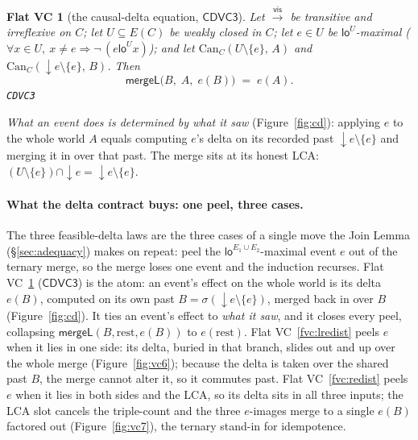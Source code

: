 \documentclass[11pt]{article}
\newtheorem{fvc}{Flat VC}
\newcommand{\vis}{\xrightarrow{\mathsf{vis}}}
\newcommand{\mergeL}{\mathsf{mergeL}}
\newcommand{\loE}[1]{\mathsf{lo}^{#1}}
\newcommand{\dow}[1]{{\downarrow}#1}
\newcommand{\cd}{\mathsf{CDVC3}}
\newcommand{\lean}[1]{\texttt{#1}}
\begin{document}
\begin{fvc}[the causal-delta equation, $\cd$]
\label{fvc:cd}
Let $\vis$ be transitive and irreflexive on $C$; let
$U \subseteq E(C)$ be weakly closed in $C$; let $e \in U$ be
$\loE{U}$-maximal
($\forall x \in U,\ x \neq e \Rightarrow \neg\,(e \mathrel{\loE{U}} x)$);
and let $\mathrm{Can}_C(U \setminus \{e\},\, A)$ and
$\mathrm{Can}_C(\dow{e} \setminus \{e\},\, B)$. Then
\[
  \mergeL\bigl(B,\; A,\; e(B)\bigr) \;=\; e(A).
\]
\hfill\lean{CDVC3}
\end{fvc}

\emph{What an event does is determined by what it saw}
(Figure~\ref{fig:cd}): applying $e$ to the whole world $A$ equals
computing $e$'s delta on its recorded past $\dow{e} \setminus \{e\}$
and merging it in over that past. The merge sits at its honest LCA:
$(U \setminus \{e\}) \cap \dow{e} = \dow{e} \setminus \{e\}$.

\paragraph{What the delta contract buys: one peel, three cases.} The three
feasible-delta laws are the three cases of a single move the Join Lemma
(\S\ref{sec:adequacy}) makes on repeat: peel the $\loE{E_1 \cup E_2}$-maximal
event $e$ out of the ternary merge, so the merge loses one event and the
induction recurses. Flat VC~\ref{fvc:cd} ($\cd$) is the atom: an event's
effect on the whole world is its delta $e(B)$, computed on its own past
$B = \sigma(\dow{e} \setminus \{e\})$, merged back in over $B$
(Figure~\ref{fig:cd}). It ties an event's effect to \emph{what it saw}, and
it closes every peel, collapsing $\mergeL(B, \text{rest}, e(B))$ to
$e(\text{rest})$. Flat VC~\ref{fvc:lredist} peels $e$ when it lies in one
side: its delta, buried in that branch, slides out and up over the whole
merge (Figure~\ref{fig:vc6}); because the delta is taken over the
shared past $B$, the merge cannot alter it, so it commutes past. Flat
VC~\ref{fvc:redist} peels $e$ when it lies in both sides and the LCA, so its
delta sits in all three inputs; the LCA slot cancels the triple-count and the
three $e$-images merge to a single $e(B)$ factored out
(Figure~\ref{fig:vc7}), the ternary stand-in for idempotence.
\end{document}
